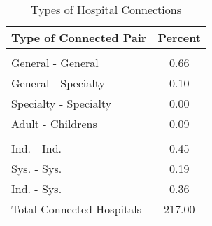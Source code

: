\begin{table}[ht!]
\centering
\caption{Types of Hospital Connections}
\centering
\begin{tabular}[t]{lc}
\toprule
Type of Connected Pair & Percent\\
\midrule
\addlinespace[0.3em]
\multicolumn{2}{l}{\textbf{ }}\\
\hspace{1em}General - General & 0.66\\
\hspace{1em}General - Specialty & 0.10\\
\hspace{1em}Specialty - Specialty & 0.00\\
Adult - Childrens & 0.09\\
\addlinespace[0.3em]
\multicolumn{2}{l}{\textbf{ }}\\
\hspace{1em}Ind. - Ind. & 0.45\\
\hspace{1em}Sys. - Sys. & 0.19\\
\hspace{1em}Ind. - Sys. & 0.36\\
\addlinespace[0.3em]
Total Connected Hospitals & 217.00\\
\bottomrule
\end{tabular}
\end{table}
